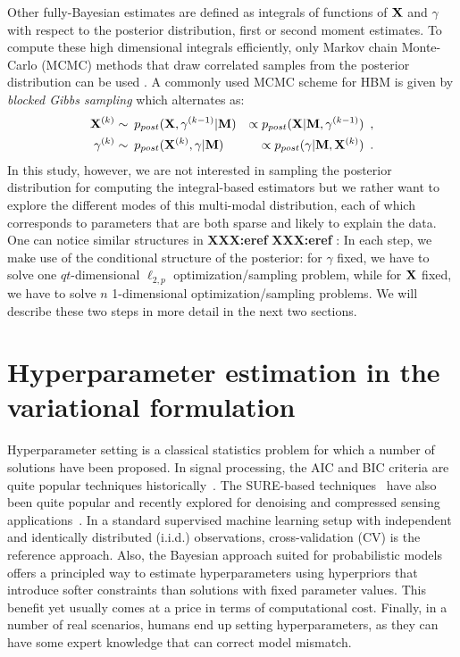 Other fully-Bayesian estimates are defined as integrals of functions of $\mathbf{X}$ and $\gamma$ with respect to the posterior distribution, \eg first or second moment estimates. To compute these high dimensional integrals efficiently, only Markov chain Monte-Carlo (MCMC) methods that draw correlated samples from the posterior distribution can be used\cite{RoCa05,KaSo05} . A commonly used MCMC scheme for HBM is given by \emph{blocked Gibbs sampling} which alternates as:
\begin{eqnarray}
\mathbf{X}^{(k)} &\sim \: p_{post}(\mathbf{X},\gamma^{(k-1)}|\mathbf{M}) &\propto p_{post}(\mathbf{X}|\mathbf{M},\gamma^{(k-1)}) \enspace, \label{eq:AS-X}\\
\gamma^{(k)} &\sim \: p_{post}(\mathbf{X}^{(k)},\gamma|\mathbf{M}) &\propto p_{post}(\gamma|\mathbf{M},\mathbf{X}^{(k)})\enspace. \label{eq:AS-gamma}
\end{eqnarray}
In this study, however, we are not interested in sampling the posterior distribution for computing the integral-based estimators but we rather want to explore the different modes of this multi-modal distribution, each of which corresponds to parameters that are both sparse and likely to explain the data.\\
One can notice similar structures in \textbf{XXX:eref}%
\textbf{XXX:eref} : In each step, we make use of the conditional structure of the posterior: for $\gamma$ fixed, we have to solve one $qt$-dimensional $\ell_{2,p}$ optimization/sampling problem, while for $\mathbf{X}$ fixed, we have to solve $n$ 1-dimensional optimization/sampling problems. We will describe these two steps in more detail in the next two sections.

\section{Hyperparameter estimation in the variational formulation}

Hyperparameter setting is a classical statistics problem for which a number of  solutions have been proposed. In signal processing, the AIC and BIC criteria are quite popular techniques historically~\cite{schwarz1978estimating}. The SURE-based techniques~\cite{stein1981estimation} have also been quite popular and recently explored for denoising and compressed sensing applications~\cite{luisier2007new, guo2015near}. In a standard supervised machine learning setup with independent and identically distributed (i.i.d.) observations, cross-validation (CV) is the reference approach. 
Also, the Bayesian approach suited for probabilistic models offers a principled way to estimate hyperparameters using hyperpriors that introduce softer constraints than solutions with fixed parameter values. This benefit yet usually comes at a price in terms of computational cost. Finally, in a number of real scenarios, humans end up setting hyperparameters, as they can have some expert knowledge that can correct model mismatch.


